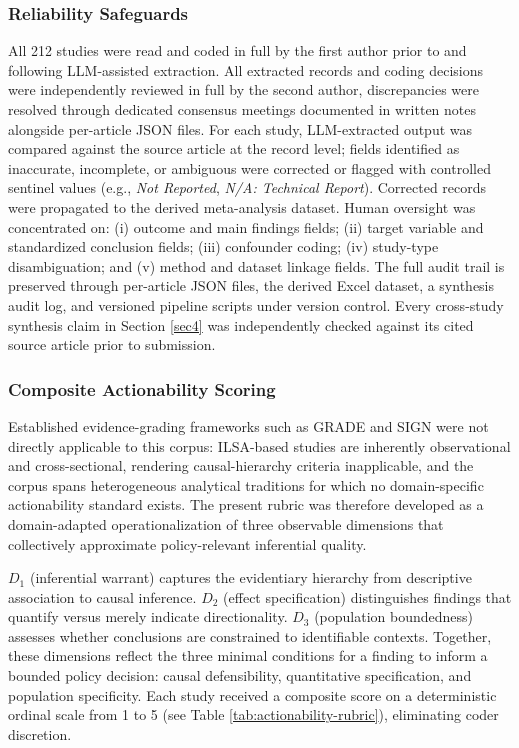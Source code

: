 \documentclass{ieeeaccess}
\begin{document}
\subsubsection{Reliability Safeguards}\label{sec:3.1.2}

All 212 studies were read and coded in full by the first author prior to and following LLM-assisted extraction. All extracted records and coding decisions were independently reviewed in full by the second author, discrepancies were resolved through dedicated consensus meetings documented in written notes alongside per-article JSON files. For each study, LLM-extracted output was compared against the source article at the record level; fields identified as inaccurate, incomplete, or ambiguous were corrected or flagged with controlled sentinel values (e.g., \textit{Not Reported}, \textit{N/A: Technical Report}). Corrected records were propagated to the derived meta-analysis dataset. Human oversight was concentrated on: (i) outcome and main findings fields; (ii) target variable and standardized conclusion fields; (iii) confounder coding; (iv) study-type disambiguation; and (v) method and dataset linkage fields. The full audit trail is preserved through per-article JSON files, the derived Excel dataset, a synthesis audit log, and versioned pipeline scripts under version control. Every cross-study synthesis claim in Section \ref{sec4} was independently checked against its cited source article prior to submission.

\subsubsection{Composite Actionability Scoring}

Established evidence-grading frameworks such as GRADE \cite{guyatt2008} and SIGN \cite{harbour2001} were not directly applicable to this corpus: ILSA-based studies are inherently observational and cross-sectional, rendering causal-hierarchy criteria inapplicable, and the corpus spans heterogeneous analytical traditions for which no domain-specific actionability standard exists. The present rubric was therefore developed as a domain-adapted operationalization of three observable dimensions that collectively approximate policy-relevant inferential quality.

$D_1$ (inferential warrant) captures the evidentiary hierarchy from descriptive association to causal inference. $D_2$ (effect specification) distinguishes findings that quantify versus merely indicate directionality. $D_3$ (population boundedness) assesses whether conclusions are constrained to identifiable contexts. Together, these dimensions reflect the three minimal conditions for a finding to inform a bounded policy decision: causal defensibility, quantitative specification, and population specificity. Each study received a composite score on a deterministic ordinal scale from 1 to 5 (see Table \ref{tab:actionability-rubric}), eliminating coder discretion.
\end{document}
